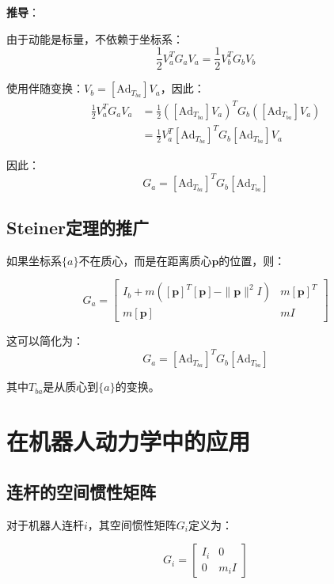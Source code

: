 \documentclass[12pt,a4paper]{article}
\begin{document}
\textbf{推导}：

由于动能是标量，不依赖于坐标系：
\begin{equation}
\frac{1}{2} V_a^T G_a V_a = \frac{1}{2} V_b^T G_b V_b
\end{equation}

使用伴随变换：$V_b = [\text{Ad}_{T_{ba}}] V_a$，因此：
\begin{align}
\frac{1}{2} V_a^T G_a V_a &= \frac{1}{2} ([\text{Ad}_{T_{ba}}] V_a)^T G_b ([\text{Ad}_{T_{ba}}] V_a) \\
&= \frac{1}{2} V_a^T [\text{Ad}_{T_{ba}}]^T G_b [\text{Ad}_{T_{ba}}] V_a
\end{align}

因此：
\begin{equation}
G_a = [\text{Ad}_{T_{ba}}]^T G_b [\text{Ad}_{T_{ba}}]
\end{equation}

\subsection{Steiner定理的推广}

如果坐标系$\{a\}$不在质心，而是在距离质心$\bm{p}$的位置，则：

\begin{equation}
G_a = \begin{bmatrix}
I_b + m([\bm{p}]^T [\bm{p}] - \|\bm{p}\|^2 I) & m [\bm{p}]^T \\
m [\bm{p}] & mI
\end{bmatrix}
\end{equation}

这可以简化为：
\begin{equation}
G_a = [\text{Ad}_{T_{ba}}]^T G_b [\text{Ad}_{T_{ba}}]
\end{equation}

其中$T_{ba}$是从质心到$\{a\}$的变换。

\section{在机器人动力学中的应用}

\subsection{连杆的空间惯性矩阵}

对于机器人连杆$i$，其空间惯性矩阵$G_i$定义为：

\begin{equation}
G_i = \begin{bmatrix}
I_i & 0 \\
0 & m_i I
\end{bmatrix}
\label{eq:link_inertia}
\end{equation}
\end{document}
